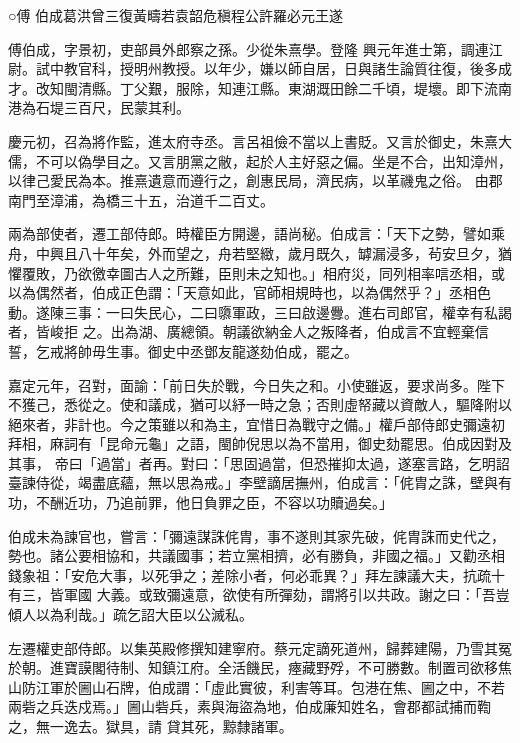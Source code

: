 
\begin{pinyinscope}

 ○傅
 伯成葛洪曾三復黃疇若袁韶危稹程公許羅必元王遂



 傅伯成，字景初，吏部員外郎察之孫。少從朱熹學。登隆
 興元年進士第，調連江尉。試中教官科，授明州教授。以年少，嫌以師自居，日與諸生論質往復，後多成才。改知閩清縣。丁父艱，服除，知連江縣。東湖溉田餘二千頃，堤壞。即下流南港為石堤三百尺，民蒙其利。



 慶元初，召為將作監，進太府寺丞。言呂祖儉不當以上書貶。又言於御史，朱熹大儒，不可以偽學目之。又言朋黨之敝，起於人主好惡之偏。坐是不合，出知漳州，以律己愛民為本。推熹遺意而遵行之，創惠民局，濟民病，以革禨鬼之俗。
 由郡南門至漳浦，為橋三十五，治道千二百丈。



 兩為部使者，遷工部侍郎。時權臣方開邊，語尚秘。伯成言：「天下之勢，譬如乘舟，中興且八十年矣，外而望之，舟若堅緻，歲月既久，罅漏浸多，茍安旦夕，猶懼覆敗，乃欲徼幸圖古人之所難，臣則未之知也。」相府災，同列相率唁丞相，或以為偶然者，伯成正色謂：「天意如此，官師相規時也，以為偶然乎？」丞相色動。遂陳三事：一曰失民心，二曰隳軍政，三曰啟邊釁。進右司郎官，權幸有私謁者，皆峻拒
 之。出為湖、廣總領。朝議欲納金人之叛降者，伯成言不宜輕棄信誓，乞戒將帥毋生事。御史中丞鄧友龍遂劾伯成，罷之。



 嘉定元年，召對，面諭：「前日失於戰，今日失之和。小使雖返，要求尚多。陛下不獲己，悉從之。使和議成，猶可以紓一時之急；否則虛帑藏以資敵人，驅降附以絕來者，非計也。今之策雖以和為主，宜惜日為戰守之備。」權戶部侍郎史彌遠初拜相，麻詞有「昆命元龜」之語，閩帥倪思以為不當用，御史劾罷思。伯成因對及其事，
 帝曰「過當」者再。對曰：「思固過當，但恐摧抑太過，遂塞言路，乞明詔臺諫侍從，竭盡底蘊，無以思為戒。」李壁謫居撫州，伯成言：「侂胄之誅，壁與有功，不酬近功，乃追前罪，他日負罪之臣，不容以功贖過矣。」



 伯成未為諫官也，嘗言：「彌遠謀誅侂胄，事不遂則其家先破，侂胄誅而史代之，勢也。諸公要相協和，共議國事；若立黨相擠，必有勝負，非國之福。」又勸丞相錢象祖：「安危大事，以死爭之；差除小者，何必乖異？」拜左諫議大夫，抗疏十有三，皆軍國
 大義。或致彌遠意，欲使有所彈劾，謂將引以共政。謝之曰：「吾豈傾人以為利哉。」疏乞詔大臣以公滅私。



 左遷權吏部侍郎。以集英殿修撰知建寧府。蔡元定謫死道州，歸葬建陽，乃雪其冤於朝。進寶謨閣待制、知鎮江府。全活饑民，瘞藏野殍，不可勝數。制置司欲移焦山防江軍於圌山石牌，伯成謂：「虛此實彼，利害等耳。包港在焦、圌之中，不若兩砦之兵迭戍焉。」圌山砦兵，素與海盜為地，伯成廉知姓名，會郡都試捕而鞫之，無一逸去。獄具，請
 貸其死，黥隸諸軍。




\end{pinyinscope}
